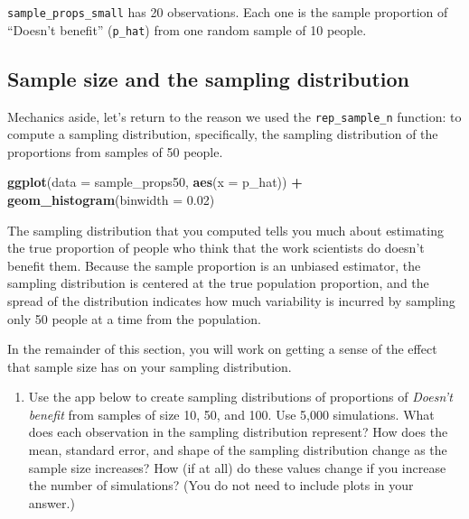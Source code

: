 \documentclass[
]{article}
\newenvironment{Shaded}{\begin{snugshade}}{\end{snugshade}}
\newcommand{\AttributeTok}[1]{\textcolor[rgb]{0.13,0.29,0.53}{#1}}
\newcommand{\FloatTok}[1]{\textcolor[rgb]{0.00,0.00,0.81}{#1}}
\newcommand{\FunctionTok}[1]{\textcolor[rgb]{0.13,0.29,0.53}{\textbf{#1}}}
\newcommand{\NormalTok}[1]{#1}
\newcommand{\SpecialCharTok}[1]{\textcolor[rgb]{0.81,0.36,0.00}{\textbf{#1}}}
\providecommand{\tightlist}{%
  \setlength{\itemsep}{0pt}\setlength{\parskip}{0pt}}
\begin{document}
\texttt{sample\_props\_small} has 20 observations. Each one is the
sample proportion of ``Doesn't benefit'' (\texttt{p\_hat}) from one
random sample of 10 people.

\subsection{Sample size and the sampling
distribution}\label{sample-size-and-the-sampling-distribution}

Mechanics aside, let's return to the reason we used the
\texttt{rep\_sample\_n} function: to compute a sampling distribution,
specifically, the sampling distribution of the proportions from samples
of 50 people.

\begin{Shaded}
\begin{Highlighting}[]
\FunctionTok{ggplot}\NormalTok{(}\AttributeTok{data =}\NormalTok{ sample\_props50, }\FunctionTok{aes}\NormalTok{(}\AttributeTok{x =}\NormalTok{ p\_hat)) }\SpecialCharTok{+}
  \FunctionTok{geom\_histogram}\NormalTok{(}\AttributeTok{binwidth =} \FloatTok{0.02}\NormalTok{)}
\end{Highlighting}
\end{Shaded}

The sampling distribution that you computed tells you much about
estimating the true proportion of people who think that the work
scientists do doesn't benefit them. Because the sample proportion is an
unbiased estimator, the sampling distribution is centered at the true
population proportion, and the spread of the distribution indicates how
much variability is incurred by sampling only 50 people at a time from
the population.

In the remainder of this section, you will work on getting a sense of
the effect that sample size has on your sampling distribution.

\begin{enumerate}
\def\labelenumi{\arabic{enumi}.}
\setcounter{enumi}{5}
\tightlist
\item
  Use the app below to create sampling distributions of proportions of
  \emph{Doesn't benefit} from samples of size 10, 50, and 100. Use 5,000
  simulations. What does each observation in the sampling distribution
  represent? How does the mean, standard error, and shape of the
  sampling distribution change as the sample size increases? How (if at
  all) do these values change if you increase the number of simulations?
  (You do not need to include plots in your answer.)
\end{enumerate}
\end{document}
